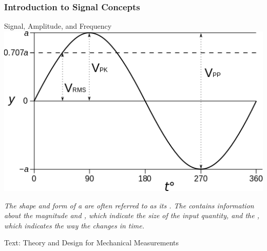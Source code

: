 \documentclass[fleqn]{beamer} %
\newcommand{\sectionIsubsectionItitle}{Introduction to Signal Concepts}
\newcommand{\btVFill}{\vskip0pt plus 1filll}
\newcommand{\uhspc}{\underline{\hspace{20 mm}}}
\begin{document}
			\begin{frame}
				\frametitle{\sectionIsubsectionItitle}
				
		\begin{multicols}{2}
		{\PR Signal}, {\RD Amplitude}, and {\BL Frequency}\vspace{2mm}\\
		\includegraphics[scale=.3]{images/amplitude_frequency.png} 
		
		
		{\it The shape and form of a {\PR \uhspc } are often referred to as its {\PN \uhspc}.
		The {\PN \uhspc} contains information about the magnitude and {\RD \uhspc}, which indicate the size of
		the input quantity, and the {\BL \uhspc}, which indicates the way the {\PR \uhspc} changes in time. }\vspace{5mm}\\
		
		\end{multicols}
		\tiny{Text: Theory and Design for Mechanical Measurements}	



			\end{frame}
\end{document}
